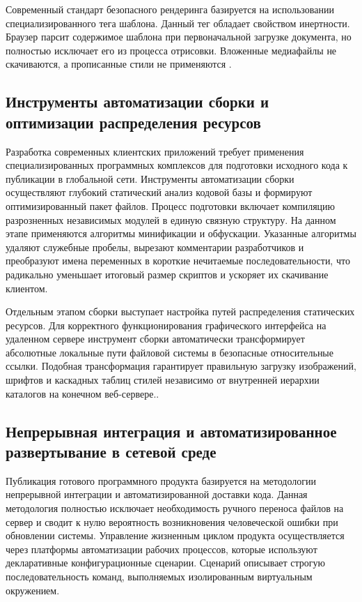 \documentclass[bachelor, och, pract, times]{SCWorks}
\begin{document}
Современный стандарт безопасного рендеринга базируется на использовании
специализированного тега шаблона. Данный тег обладает свойством инертности.
Браузер парсит содержимое шаблона при первоначальной загрузке документа, но
полностью исключает его из процесса отрисовки. Вложенные медиафайлы не
скачиваются, а прописанные стили не применяются \cite{mdn_template}.

\subsection{Инструменты автоматизации сборки и оптимизации распределения ресурсов}
Разработка современных клиентских приложений требует применения
специализированных программных комплексов для подготовки исходного кода к
публикации в глобальной сети. Инструменты автоматизации сборки осуществляют
глубокий статический анализ кодовой базы и формируют оптимизированный пакет
файлов. Процесс подготовки включает компиляцию разрозненных независимых модулей
в единую связную структуру. На данном этапе применяются алгоритмы минификации и
обфускации. Указанные алгоритмы удаляют служебные пробелы, вырезают комментарии
разработчиков и преобразуют имена переменных в короткие нечитаемые
последовательности, что радикально уменьшает итоговый размер скриптов и
ускоряет их скачивание клиентом.

Отдельным этапом сборки выступает настройка путей распределения статических
ресурсов. Для корректного функционирования графического интерфейса на удаленном
сервере инструмент сборки автоматически трансформирует абсолютные локальные
пути файловой системы в безопасные относительные ссылки. Подобная трансформация
гарантирует правильную загрузку изображений, шрифтов и каскадных таблиц стилей
независимо от внутренней иерархии каталогов на конечном веб-сервере.\cite{vite_docs}.

\subsection{Непрерывная интеграция и автоматизированное развертывание в сетевой среде}
Публикация готового программного продукта базируется на методологии непрерывной
интеграции и автоматизированной доставки кода. Данная методология полностью
исключает необходимость ручного переноса файлов на сервер и сводит к нулю
вероятность возникновения человеческой ошибки при обновлении системы.
Управление жизненным циклом продукта осуществляется через платформы
автоматизации рабочих процессов, которые используют декларативные
конфигурационные сценарии. Сценарий описывает строгую последовательность
команд, выполняемых изолированным виртуальным окружением.
\end{document}
